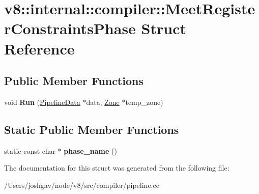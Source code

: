 \hypertarget{structv8_1_1internal_1_1compiler_1_1_meet_register_constraints_phase}{}\section{v8\+:\+:internal\+:\+:compiler\+:\+:Meet\+Register\+Constraints\+Phase Struct Reference}
\label{structv8_1_1internal_1_1compiler_1_1_meet_register_constraints_phase}
\subsection*{Public Member Functions}
\begin{DoxyCompactItemize}
\item 
void {\bfseries Run} (\hyperlink{classv8_1_1internal_1_1compiler_1_1_pipeline_data}{Pipeline\+Data} $\ast$data, \hyperlink{classv8_1_1internal_1_1_zone}{Zone} $\ast$temp\+\_\+zone)\hypertarget{structv8_1_1internal_1_1compiler_1_1_meet_register_constraints_phase_aeca7630ba5d72b33c274b40ef028c726}{}\label{structv8_1_1internal_1_1compiler_1_1_meet_register_constraints_phase_aeca7630ba5d72b33c274b40ef028c726}

\end{DoxyCompactItemize}
\subsection*{Static Public Member Functions}
\begin{DoxyCompactItemize}
\item 
static const char $\ast$ {\bfseries phase\+\_\+name} ()\hypertarget{structv8_1_1internal_1_1compiler_1_1_meet_register_constraints_phase_ac5b8560af5acad57b9886dcc4cb482ed}{}\label{structv8_1_1internal_1_1compiler_1_1_meet_register_constraints_phase_ac5b8560af5acad57b9886dcc4cb482ed}

\end{DoxyCompactItemize}


The documentation for this struct was generated from the following file\+:\begin{DoxyCompactItemize}
\item 
/\+Users/joshgav/node/v8/src/compiler/pipeline.\+cc\end{DoxyCompactItemize}
